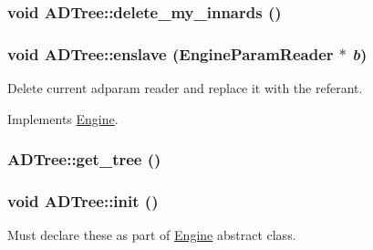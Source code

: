 \hypertarget{classADTree_ae6466f8f99be68c8f887b06c3d962964}{
\subsubsection[{delete\_\-my\_\-innards}]{\setlength{\rightskip}{0pt plus 5cm}void ADTree::delete\_\-my\_\-innards ()}}
\label{classADTree_ae6466f8f99be68c8f887b06c3d962964}
\hypertarget{classADTree_a4e89d611e7dc79fa8826efa742f9ce42}{
\subsubsection[{enslave}]{\setlength{\rightskip}{0pt plus 5cm}void ADTree::enslave ({\bf EngineParamReader} $\ast$ {\em b})}}
\label{classADTree_a4e89d611e7dc79fa8826efa742f9ce42}
Delete current adparam reader and replace it with the referant. 

Implements \hyperlink{classEngine_a023e094182312b1732fe53754c2fe5cb}{Engine}.

\hypertarget{classADTree_acd4ffcfe3f27fff312b143689b7add52}{
\subsubsection[{get\_\-tree}]{ ADTree::get\_\-tree ()}}
\label{classADTree_acd4ffcfe3f27fff312b143689b7add52}
\hypertarget{classADTree_a70b34e300c187fb817bc6d8ba31aceaa}{
\subsubsection[{init}]{\setlength{\rightskip}{0pt plus 5cm}void ADTree::init ()}}
\label{classADTree_a70b34e300c187fb817bc6d8ba31aceaa}


Must declare these as part of \hyperlink{classEngine}{Engine} abstract class. 

